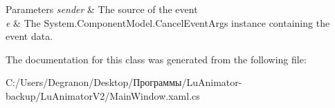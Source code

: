\begin{DoxyParams}{Parameters}
{\em sender} & The source of the event\\
\hline
{\em e} & The System.\+Component\+Model.\+Cancel\+Event\+Args instance containing the event data.\\
\hline
\end{DoxyParams}


The documentation for this class was generated from the following file\+:\begin{DoxyCompactItemize}
\item 
C\+:/\+Users/\+Degranon/\+Desktop/Программы/\+Lu\+Animator-\/backup/\+Lu\+Animator\+V2/Main\+Window.\+xaml.\+cs\end{DoxyCompactItemize}
